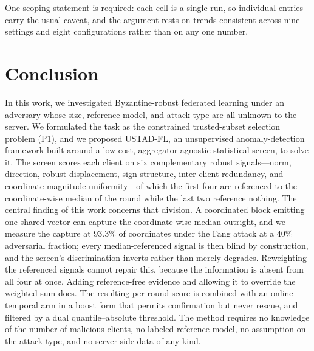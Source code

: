 \documentclass[journal]{IEEEtran}
\begin{document}
One scoping statement is required: each cell is a single run, so individual entries carry the usual caveat, and the argument rests on trends consistent across nine settings and eight configurations rather than on any one number.

\section{Conclusion}
\label{sec:conclusion}

In this work, we investigated Byzantine-robust federated learning under an adversary whose size, reference model, and attack type are all unknown to the server. We formulated the task as the constrained trusted-subset selection problem (P1), and we proposed USTAD-FL, an unsupervised anomaly-detection framework built around a low-cost, aggregator-agnostic statistical screen, to solve it. The screen scores each client on six complementary robust signals---norm, direction, robust displacement, sign structure, inter-client redundancy, and coordinate-magnitude uniformity---of which the first four are referenced to the coordinate-wise median of the round while the last two reference nothing. The central finding of this work concerns that division. A coordinated block emitting one shared vector can capture the coordinate-wise median outright, and we measure the capture at $93.3\%$ of coordinates under the Fang attack at a $40\%$ adversarial fraction; every median-referenced signal is then blind by construction, and the screen's discrimination inverts rather than merely degrades. Reweighting the referenced signals cannot repair this, because the information is absent from all four at once. Adding reference-free evidence and allowing it to override the weighted sum does. The resulting per-round score is combined with an online temporal arm in a boost form that permits confirmation but never rescue, and filtered by a dual quantile--absolute threshold. The method requires no knowledge of the number of malicious clients, no labeled reference model, no assumption on the attack type, and no server-side data of any kind.
\end{document}
